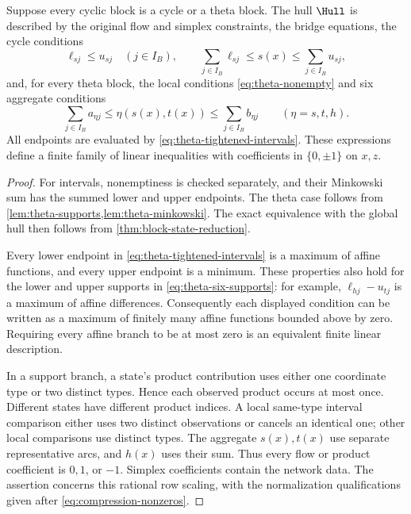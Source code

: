 \begin{theorem}\label{thm:theta-hull}
Suppose every cyclic block is a cycle or a theta block. The hull $\Hull$
is described by the original flow and simplex constraints, the bridge
equations, the cycle conditions
\begin{equation}\label{eq:cycle-hull}
 \ell_{sj}\le u_{sj}\quad(j\in I_B),\qquad
 \sum_{j\in I_B}\ell_{sj}\le s(x)\le\sum_{j\in I_B}u_{sj},
\end{equation}
and, for every theta block, the local conditions
\eqref{eq:theta-nonempty} and six aggregate conditions
\begin{equation}\label{eq:theta-aggregate}
 \sum_{j\in I_B}a_{\eta j}\le\eta(s(x),t(x))
                   \le\sum_{j\in I_B}b_{\eta j}\qquad(\eta=s,t,h).
\end{equation}
All endpoints are evaluated by \eqref{eq:theta-tightened-intervals}.
These expressions define a finite family of linear inequalities with
coefficients in $\{0,\pm1\}$ on $x,z$.
\end{theorem}
\begin{proof}
For intervals, nonemptiness is checked separately, and their Minkowski
sum has the summed lower and upper endpoints. The theta case follows
from \cref{lem:theta-supports,lem:theta-minkowski}. The exact equivalence
with the global hull then follows from
\cref{thm:block-state-reduction}.

Every lower endpoint in \eqref{eq:theta-tightened-intervals} is a maximum
of affine functions, and every upper endpoint is a minimum. These
properties also hold for the lower and upper supports in
\eqref{eq:theta-six-supports}: for example,
$\ell_{hj}-u_{tj}$ is a maximum of affine differences. Consequently
each displayed condition can be written as a maximum of finitely many
affine functions bounded above by zero. Requiring every affine branch
to be at most zero is an equivalent finite linear description.

In a support branch, a state's product contribution uses either one
coordinate type or two distinct types. Hence each observed product occurs
at most once. Different states have different product indices. A local
same-type interval comparison either uses two distinct observations or
cancels an identical one; other local comparisons use distinct types.
The aggregate $s(x),t(x)$ use separate representative arcs, and $h(x)$
uses their sum. Thus every flow or product coefficient is $0,1$, or
$-1$. Simplex coefficients contain the network data. The assertion
concerns this rational row scaling, with the normalization qualifications
given after \eqref{eq:compression-nonzeros}.
\end{proof}

